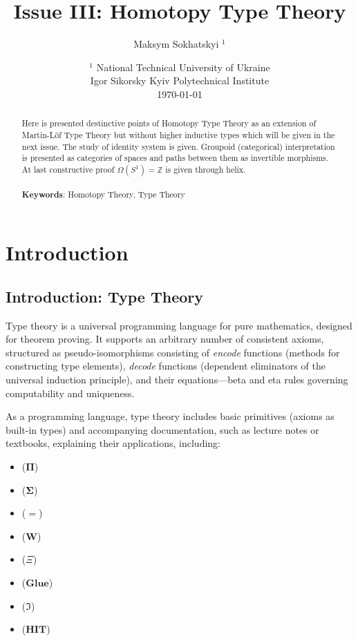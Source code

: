 \documentclass{article}
\theoremstyle{definition}
\begin{document}
\title{Issue III: Homotopy Type Theory}
\author{Maksym Sokhatskyi $^1$}
\date{ $^1$ National Technical University of Ukraine \\
       \small Igor Sikorsky Kyiv Polytechnical Institute \\
       \today }

\maketitle

\begin{abstract}
Here is presented destinctive points of Homotopy Type Theory
as an extension of Martin-Löf Type Theory but without higher inductive types
which will be given in the next issue. The study of identity system is given.
Groupoid (categorical) interpretation is presented as categories of spaces and paths between them as invertible morphisms.
At last constructive proof $\Omega(S^1)=\mathbb{Z}$ is given through helix.
\\
\\
{\bf Keywords}: Homotopy Theory, Type Theory
\end{abstract}

\newpage
\tableofcontents

\newpage
\section{Introduction}
\subsection{Introduction: Type Theory}
Type theory is a universal programming language for pure mathematics,
designed for theorem proving. It supports an arbitrary number of consistent
axioms, structured as pseudo-isomorphisms consisting of \textit{encode}
functions (methods for constructing type elements), \textit{decode}
functions (dependent eliminators of the universal induction principle),
and their equations---beta and eta rules governing computability and
uniqueness.

As a programming language, type theory includes basic
primitives (axioms as built-in types) and accompanying documentation,
such as lecture notes or textbooks, explaining their applications, including:

\begin{itemize}
\item {} ($\mathbf{\Pi}$)
\item {} ($\mathbf{\Sigma}$)
\item {} ($\mathbf{=}$)
\item {} ($\mathbf{W}$)
\item {} ($\Xi$)
\item {} ($\mathbf{Glue}$)
\item {} ($\Im$)
\item {} ($\mathbf{HIT}$)
\end{itemize}
\end{document}
